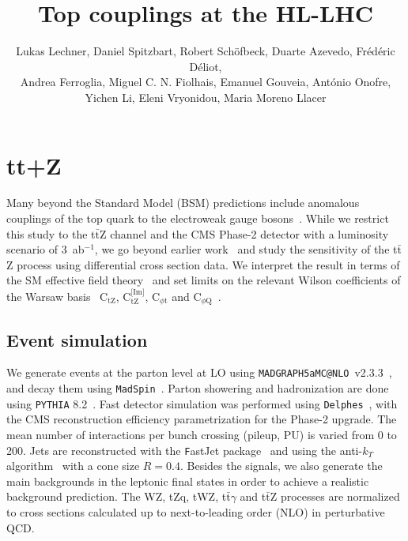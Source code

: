 \documentclass[letterpaper,11pt]{article}
\title{Top couplings at the HL-LHC}
\author{Lukas Lechner, Daniel Spitzbart, Robert Sch\"ofbeck, Duarte Azevedo,
Fr\'ed\'eric D\'eliot,\\
Andrea Ferroglia,
Miguel C. N. Fiolhais,
Emanuel Gouveia,
Ant\'onio Onofre,\\ Yichen Li, Eleni Vryonidou, Maria Moreno Llacer}
\date{}
\makeatletter
\def\ttZ{t$\bar{\text{t}}$Z\xspace}
\def\ttG{t$\bar{\text{t}}\gamma$\xspace}
\def\WZ{WZ\xspace}
\def\tZq{tZq\xspace}
\def\tWZ{tWZ\xspace}
\def\ctZ{C$_\text{tZ}$\xspace}
\def\ctZI{C$_\text{tZ}^\text{[Im]}$\xspace}
\def\cpt{C$_{\phi \text{t}}$\xspace}
\def\cpQM{C$_{\phi \text{Q}}$\xspace}
\def\delphes{\texttt{Delphes}\xspace}
\def\MGvATNLO{\texttt{MADGRAPH5aMC@NLO}\xspace}
\def\PYTHIA{\texttt{PYTHIA}\xspace}
\def\MadSpin{\texttt{MadSpin}\xspace}
\makeatother
\begin{document}
\maketitle

\section{tt+Z}
Many beyond the Standard Model (BSM) predictions include anomalous couplings of the top quark to the electroweak gauge bosons~\cite{Hollik:1998vz,Agashe:2006wa,Kagan:2009bn,Ibrahim:2010hv,Ibrahim:2011im,Grojean:2013qca,Richard:2013pwa}.
While we restrict this study to the \ttZ channel and the CMS Phase-2 detector with a luminosity scenario of 3~ab${}^{-1}$, we go beyond earlier work~\cite{Rontsch:2015una} and study the sensitivity of the \ttZ process using differential cross section data.
We interpret the result in terms of the SM effective field theory~\cite{AguilarSaavedra:2018nen} and set limits on the relevant Wilson coefficients of the Warsaw basis~\cite{Grzadkowski:2010es} \ctZ, \ctZI, \cpt and \cpQM~\cite{Brehmer:2016nyr, Brehmer:2017fyp}.
\subsection{Event simulation}
\label{sec:eventsimulation}
We generate events at the parton level at LO using \MGvATNLO~v2.3.3~\cite{Alwall:2014hca}, and decay them using \MadSpin~\cite{Artoisenet:2012st, Frixione:2007zp}.
Parton showering and hadronization are done using \PYTHIA 8.2~\cite{Sjostrand:2007gs,Sjostrand:2014zea}.
Fast detector simulation was performed using \delphes~\cite{deFavereau:2013fsa}, with the CMS reconstruction efficiency parametrization for the Phase-2 upgrade.
The mean number of interactions per bunch crossing (pileup, PU) is varied from 0 to 200.
Jets are reconstructed with the {\texttt FastJet} package~\cite{Cacciari:2011ma} and using the anti-$k_T$ algorithm~\cite{Cacciari:2008gp} with a cone size $R=0.4$.
Besides the signals, we also generate the main backgrounds in the leptonic final states in order to achieve a realistic background prediction.
The \WZ, \tZq, \tWZ, \ttG and \ttZ processes are normalized to cross sections calculated up to next-to-leading order (NLO) in perturbative QCD.
\end{document}
